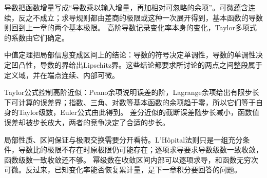 导数把函数增量写成“导数乘以输入增量，再加相对可忽略的余项”。可微蕴含连续，反之不成立；求导规则都由差商的极限或这种一次展开得到，基本函数的导数则回到上一章的两个基本极限。
高阶导数记录变化率本身的变化，Taylor多项式的系数由它们确定。

中值定理把局部信息变成区间上的结论：导数的符号决定单调性，导数的单调性决定凹凸性，导数的界给出Lipschitz界。这些结论都要求所讨论的两点之间整段属于定义域，并在端点连续、内部可微。

Taylor公式控制高阶近似：Peano余项说明误差的阶，Lagrange余项给出有限步长下可计算的误差界；指数、三角、对数等基本函数的余项趋于零，所以它们等于自身的Taylor级数，Euler公式由此得到。
差分近似的截断误差随步长减小，函数值误差却被步长放大，两者的竞争决定了合适的步长。

局部性质、区间保证与极限交换需要分开看待。L'Hôpital法则只是一组充分条件，导数比的极限不存在时原极限仍可能存在；逐项求导要求导数级数一致收敛，函数级数一致收敛还不够。
幂级数在收敛区间内部可以逐项求导，和函数无穷次可微。反过来，已知变化率能否恢复累计量，是下一章积分要回答的问题。
